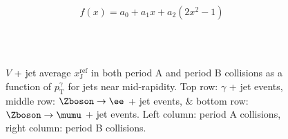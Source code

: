\documentclass[NOTE, atlasdraft=true, texlive=2016, USenglish]{\ATLASLATEXPATH atlasdoc}
\begin{document}
\begin{equation}
	f (x) = a_0 + a_1x  + a_2\left(2x^2 - 1\right)
	\label{eq:fit}
\end{equation}



\begin{figure}[htbp]
	\centering
	 \\
	 \\
	\caption{$V$ + jet average $x_{\text{J}}^{\text{ref}}$ in both period A and period B collisions as a function of $p_{\text{T}}^{\gamma}$ for jets near mid-rapidity. Top row: $\gamma$ + jet events, middle row: $\Zboson\rightarrow\ee$ + jet events, \& bottom row: $\Zboson\rightarrow\mumu$ + jet events. Left column: period A collisions, right column: period B collisions.}
	\label{fig:xjref_pT_central}
\end{figure}
\end{document}
